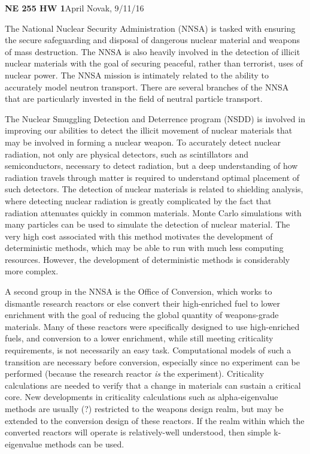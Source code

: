 \documentclass[11pt]{article}
\begin{document}
\textbf{NE 255 HW 1}\hfill April Novak, 9/11/16\newline

The National Nuclear Security Administration (NNSA) is tasked with ensuring the secure safeguarding and disposal of dangerous nuclear material and weapons of mass destruction. The NNSA is also heavily involved in the detection of illicit nuclear materials with the goal of securing peaceful, rather than terrorist, uses of nuclear power. The NNSA mission is intimately related to the ability to accurately model neutron transport. There are several branches of the NNSA that are particularly invested in the field of neutral particle transport.

The Nuclear Smuggling Detection and Deterrence program (NSDD) is involved in improving our abilities to detect the illicit movement of nuclear materials that may be involved in forming a nuclear weapon. To accurately detect nuclear radiation, not only are physical detectors, such as scintillators   and semiconductors, necessary to detect radiation, but a deep understanding of how radiation travels through matter is required to understand optimal placement of such detectors. The detection of nuclear materials is related to shielding analysis, where detecting nuclear radiation is greatly complicated by the fact that radiation attenuates quickly in common materials. Monte Carlo simulations with many particles can be used to simulate the detection of nuclear material. The very high cost associated with this method motivates the development of deterministic methods, which may be able to run with much less computing resources. However, the development of deterministic methods is considerably more complex.

A second group in the NNSA is the Office of Conversion, which works to dismantle research reactors or else convert their high-enriched fuel to lower enrichment with the goal of reducing the global quantity of weapons-grade materials. Many of these reactors were specifically designed to use high-enriched fuels, and conversion to a lower enrichment, while still meeting criticality requirements, is not necessarily an easy task. Computational models of such a transition are necessary before conversion, especially since no experiment can be performed (because the research reactor \textit{is} the experiment). Criticality calculations are needed to verify that a change in materials can sustain a critical core. New developments in criticality calculations such as alpha-eigenvalue methods are usually (?) restricted to the weapons design realm, but may be extended to the conversion design of these reactors. If the realm within which the converted reactors will operate is relatively-well understood, then simple k-eigenvalue methods can be used. 
\end{document}
